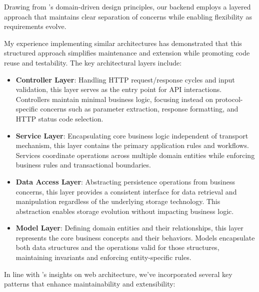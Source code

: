 \documentclass[12pt,a4paper]{article}
\begin{document}
Drawing from \citet{percival2020}'s domain-driven design principles, our backend employs a layered approach that maintains clear separation of concerns while enabling flexibility as requirements evolve.

My experience implementing similar architectures has demonstrated that this structured approach simplifies maintenance and extension while promoting code reuse and testability. The key architectural layers include:

\begin{itemize}
    \item \textbf{Controller Layer}: Handling HTTP request/response cycles and input validation, this layer serves as the entry point for API interactions. Controllers maintain minimal business logic, focusing instead on protocol-specific concerns such as parameter extraction, response formatting, and HTTP status code selection.
    \item \textbf{Service Layer}: Encapsulating core business logic independent of transport mechanism, this layer contains the primary application rules and workflows. Services coordinate operations across multiple domain entities while enforcing business rules and transactional boundaries.
    \item \textbf{Data Access Layer}: Abstracting persistence operations from business concerns, this layer provides a consistent interface for data retrieval and manipulation regardless of the underlying storage technology. This abstraction enables storage evolution without impacting business logic.
    \item \textbf{Model Layer}: Defining domain entities and their relationships, this layer represents the core business concepts and their behaviors. Models encapsulate both data structures and the operations valid for those structures, maintaining invariants and enforcing entity-specific rules.
\end{itemize}

In line with \citet{fielding2002}'s insights on web architecture, we've incorporated several key patterns that enhance maintainability and extensibility:
\end{document}
